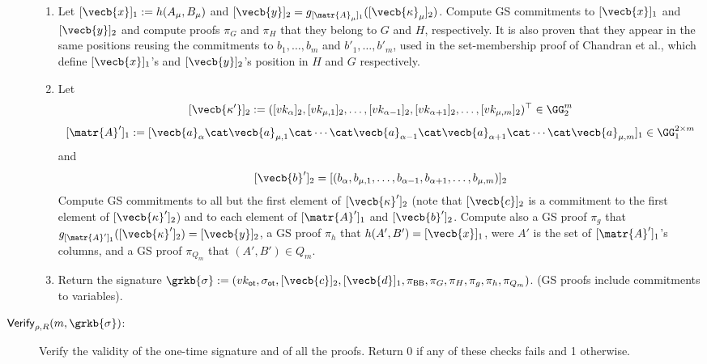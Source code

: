 \begin{description}
\begin{enumerate}
\item Let $[\vecb{x}]_1:=h(A_\mu,B_\mu)$ and $[\vecb{y}]_2=g_{[\matr{A}_\mu]_1}([\vecb{\kappa}_\mu]_2)$. Compute GS commitments to $[\vecb{x}]_1$ and $[\vecb{y}]_2$ and compute proofs $\pi_G$ and $\pi_H$ that they belong to $G$ and $H$, respectively. It is also proven that they appear in the same positions reusing the commitments to $b_1,\ldots,b_{m}$ and $b'_1,\ldots,b'_{m}$, used in the set-membership proof of Chandran et al., which define $[\vecb{x}]_1$'s and $[\vecb{y}]_2$'s position in $H$ and $G$ respectively.

\item Let
$$[\vecb{\kappa'}]_2:=([vk_\alpha]_2,[vk_{\mu,1}]_2,\ldots,[vk_{\alpha-1}]_2,[vk_{\alpha+1}]_2,\ldots,[vk_{\mu,m}]_2)^\top\in\GG_2^m$$
$$[\matr{A}']_1:=[\vecb{a}_\alpha \cat \vecb{a}_{\mu,1} \cat \cdots \cat \vecb{a}_{\alpha-1}\cat \vecb{a}_{\alpha+1}\cat\cdots\cat\vecb{a}_{\mu,m}]_1\in\GG_1^{2\times m}$$
and
$$
[\vecb{b}']_2 = [(b_\alpha, b_{\mu,1},\ldots,b_{\alpha-1},b_{\alpha+1},\ldots,b_{\mu,m})]_2
$$
Compute GS commitments to all but the first element of $[\vecb{\kappa}']_2$ (note that $[\vecb{c}]_2$ is a commitment to the first element of $[\vecb{\kappa}']_2$) and to each element of $[\matr{A}']_1$ and $[\vecb{b}']_2$. Compute also a GS proof $\pi_g$ that $g_{[\matr{A}']_1}([\vecb{\kappa}']_2)=[\vecb{y}]_2$, a GS proof $\pi_{h}$ that $h(A',B')=[\vecb{x}]_1$, were $A'$ is the set of $[\matr{A}']_1$'s columns, and a GS proof $\pi_{Q_m}$ that $(A',B')\in Q_m$.

\item Return the signature $\grkb{\sigma}:=(vk_\mathsf{ot},\sigma_\mathsf{ot},[\vecb{c}]_2,[\vecb{d}]_1,\pi_{\mathsf{BB}},\pi_G,\pi_H, \pi_g,\pi_h,\pi_{Q_m})$. (GS proofs include commitments to variables).
\end{enumerate}

\item[$\mathsf{Verify}_{\rho,R}(m,\grkb{\sigma})$:] Verify the validity of the one-time signature and of all the proofs. Return 0 if any of these checks fails and 1 otherwise.
\end{description}

